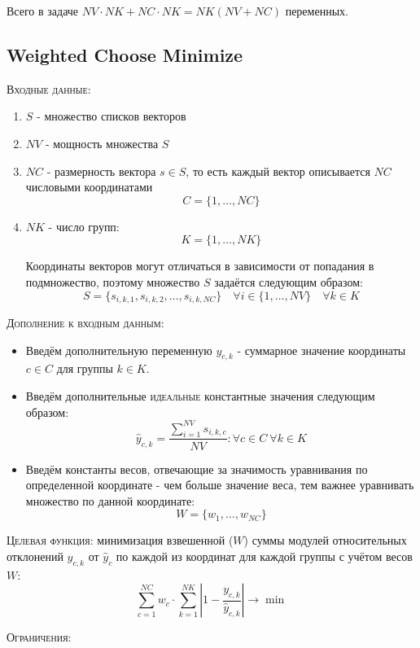 \documentclass[%
10pt, %
final, %
oneside, %
onecolumn, %
centertags]{article} %
\theoremstyle{plain}
\theoremstyle{definition}
\theoremstyle{remark}
\begin{document}
Всего в задаче $NV\cdot NK + NC\cdot NK = NK(NV+NC)$ переменных.


\newpage
\subsection{Weighted Choose Minimize}

\textsc{Входные данные}: 
\begin{enumerate}
	\item $S$ - множество списков векторов
	\item $NV$ - мощность множества $S$
	\item $NC$ - размерность вектора $s \in S$, то есть каждый вектор описывается $NC$ числовыми координатами
	$$C = \{1,\ldots,NC\}$$
	\item $NK$ - число групп:
	$$K = \{1,\ldots,NK\}$$

	Координаты векторов могут отличаться в зависимости от попадания в подмножество, поэтому множество $S$ задаётся следующим образом:
	$$S = \{s_{i,k,1},s_{i,k,2},\ldots,s_{i,k,NC}\} \quad \forall i \in \{1,\ldots,NV\} \quad \forall k \in K$$
	
\end{enumerate}
\textsc{Дополнение к входным данным}:
\begin{itemize}
	\item Введём дополнительную переменную $y_{c,k}$ - суммарное значение координаты $c \in C$ для группы $k \in K$.
	\item Введём дополнительные \textsc{идеальные} константные значения следующим образом:
	$$\hat{y}_{c,k} = \frac{\sum\limits_{i=1}^{NV}s_{i,k,c}}{NV} : \forall c \in C \ \forall k \in K$$
	\item Введём константы весов, отвечающие за значимость уравнивания по определенной координате - чем больше значение веса, тем важнее уравнивать множество по данной координате:
	$$W = \{w_1,\ldots,w_{NC}\}$$
\end{itemize}

\textsc{Целевая функция:} минимизация взвешенной ($W$) суммы модулей относительных отклонений $y_{c,k}$ от $\hat{y}_c$ по каждой из координат для каждой группы с учётом весов $W$:
$$\sum\limits_{c=1}^{NC} w_c \cdot \sum\limits_{k=1}^{NK}  \left\vert 1 - \frac{y_{c,k}}{\hat{y}_{c,k}}\right\vert \to \min$$

\newpage
\textsc{Ограничения}:
\end{document}
